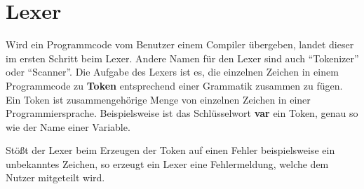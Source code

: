 \section{Lexer} \label{sec:lexer}
Wird ein Programmcode vom Benutzer einem Compiler übergeben, landet dieser im ersten Schritt beim Lexer. Andere Namen für den Lexer sind auch \enquote{Tokenizer} oder \enquote{Scanner}. Die Aufgabe des Lexers ist es, die einzelnen Zeichen in einem Programmcode zu \textbf{Token} entsprechend einer Grammatik zusammen zu fügen. Ein Token ist zusammengehörige Menge von einzelnen Zeichen in einer Programmiersprache. Beispielsweise ist das Schlüsselwort \textbf{var} ein Token, genau so wie der Name einer Variable.

Stößt der Lexer beim Erzeugen der Token auf einen Fehler beispielsweise ein unbekanntes Zeichen, so erzeugt ein Lexer eine Fehlermeldung, welche dem Nutzer mitgeteilt wird.